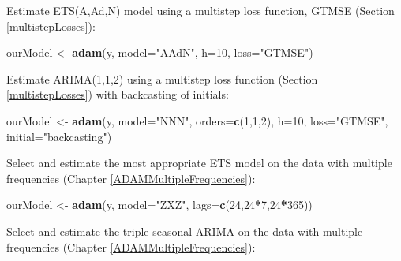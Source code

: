\documentclass[]{book}
\newenvironment{Shaded}{\begin{snugshade}}{\end{snugshade}}
\newcommand{\DataTypeTok}[1]{\textcolor[rgb]{0.13,0.29,0.53}{#1}}
\newcommand{\DecValTok}[1]{\textcolor[rgb]{0.00,0.00,0.81}{#1}}
\newcommand{\KeywordTok}[1]{\textcolor[rgb]{0.13,0.29,0.53}{\textbf{#1}}}
\newcommand{\NormalTok}[1]{#1}
\newcommand{\OperatorTok}[1]{\textcolor[rgb]{0.81,0.36,0.00}{\textbf{#1}}}
\newcommand{\StringTok}[1]{\textcolor[rgb]{0.31,0.60,0.02}{#1}}
\theoremstyle{definition}
\theoremstyle{definition}
\theoremstyle{definition}
\theoremstyle{definition}
\theoremstyle{remark}
\begin{document}
Estimate ETS(A,Ad,N) model using a multistep loss function, GTMSE (Section \ref{multistepLosses}):

\begin{Shaded}
\begin{Highlighting}[]
\NormalTok{ourModel <-}\StringTok{ }\KeywordTok{adam}\NormalTok{(y, }\DataTypeTok{model=}\StringTok{"AAdN"}\NormalTok{,}
                 \DataTypeTok{h=}\DecValTok{10}\NormalTok{, }\DataTypeTok{loss=}\StringTok{"GTMSE"}\NormalTok{)}
\end{Highlighting}
\end{Shaded}

Estimate ARIMA(1,1,2) using a multistep loss function (Section \ref{multistepLosses}) with backcasting of initials:

\begin{Shaded}
\begin{Highlighting}[]
\NormalTok{ourModel <-}\StringTok{ }\KeywordTok{adam}\NormalTok{(y, }\DataTypeTok{model=}\StringTok{"NNN"}\NormalTok{, }\DataTypeTok{orders=}\KeywordTok{c}\NormalTok{(}\DecValTok{1}\NormalTok{,}\DecValTok{1}\NormalTok{,}\DecValTok{2}\NormalTok{),}
                 \DataTypeTok{h=}\DecValTok{10}\NormalTok{, }\DataTypeTok{loss=}\StringTok{"GTMSE"}\NormalTok{, }\DataTypeTok{initial=}\StringTok{"backcasting"}\NormalTok{)}
\end{Highlighting}
\end{Shaded}

Select and estimate the most appropriate ETS model on the data with multiple frequencies (Chapter \ref{ADAMMultipleFrequencies}):

\begin{Shaded}
\begin{Highlighting}[]
\NormalTok{ourModel <-}\StringTok{ }\KeywordTok{adam}\NormalTok{(y, }\DataTypeTok{model=}\StringTok{"ZXZ"}\NormalTok{, }\DataTypeTok{lags=}\KeywordTok{c}\NormalTok{(}\DecValTok{24}\NormalTok{,}\DecValTok{24}\OperatorTok{*}\DecValTok{7}\NormalTok{,}\DecValTok{24}\OperatorTok{*}\DecValTok{365}\NormalTok{))}
\end{Highlighting}
\end{Shaded}

Select and estimate the triple seasonal ARIMA on the data with multiple frequencies (Chapter \ref{ADAMMultipleFrequencies}):
\end{document}
